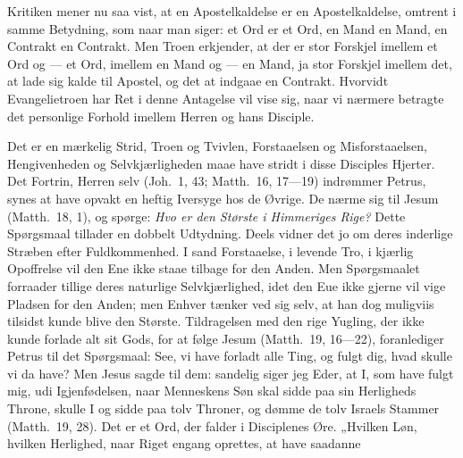 \documentclass[12pt,a4paper]{book}
\begin{document}
Kritiken mener nu saa vist, at en Apostelkaldelse er en Apostelkaldelse, omtrent
i samme Betydning, som naar man siger: et Ord er et Ord, en Mand en Mand, en
Contrakt en Contrakt.
Men Troen erkjender, at der er stor Forskjel imellem et Ord og --- et Ord,
imellem en Mand og --- en Mand, ja stor Forskjel imellem det, at lade sig kalde
til Apostel, og det at indgaae en Contrakt. Hvorvidt Evangelietroen har Ret i
denne Antagelse vil vise sig, naar vi nærmere betragte det personlige Forhold
imellem Herren og hans Disciple.

Det er en mærkelig Strid, Troen og Tvivlen, Forstaaelsen og Misforstaaelsen,
Hengivenheden og Selvkjærligheden maae have stridt i disse Disciples Hjerter.
Det Fortrin, Herren selv (Joh.\ 1, 43; Matth.\ 16, 17---19) indrømmer Petrus,
synes at have opvakt en heftig Iversyge hos de Øvrige. De nærme sig til Jesum
(Matth.\ 18, 1), og spørge: \emph{Hvo er den Største i Himmeriges Rige?} Dette
Spørgsmaal tillader en dobbelt Udtydning. Deels vidner det jo om deres inderlige
Stræben efter Fuldkommenhed. I sand Forstaaelse, i levende Tro, i kjærlig
Opoffrelse vil den Ene ikke staae tilbage for den Anden. Men Spørgsmaalet
forraader tillige deres naturlige Selvkjærlighed, idet den Eue ikke gjerne vil
vige Pladsen for den Anden; men Enhver tænker ved sig selv, at han dog muligviis
tilsidst kunde blive den Største. Tildragelsen med den rige Yugling, der ikke
kunde forlade alt sit Gods, for at følge Jesum (Matth.\ 19, 16---22),
foranlediger Petrus til det Spørgsmaal: {\large See, vi have forladt alle Ting,
og fulgt dig, hvad skulle vi da have? Men Jesus sagde til dem: sandelig siger jeg
Eder, at I, som have fulgt mig, udi Igjenfødelsen, naar Menneskens Søn skal sidde
paa sin Herligheds Throne, skulle I og sidde paa tolv Throner, og dømme de tolv
Israels Stammer (Matth.\ 19, 28).} Det er et Ord, der falder i Disciplenes Øre.
„Hvilken Løn, hvilken Herlighed, naar Riget engang oprettes, at have saadanne
\end{document}
